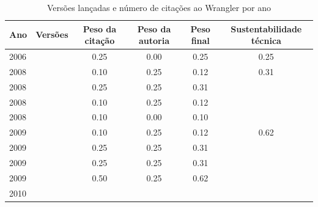 \begin{table}[H]
\caption{Versões lançadas e número de citações ao Wrangler por ano}
\centering
\begin{tabular}{| l | c | c | c | c | c |}
  \hline
  Ano & Versões & Peso da citação & Peso da autoria & Peso final & Sustentabilidade técnica \\
  \hline
            2006
          &
          
          &
          0.25
          &
          0.00
          &
          0.25
          &
            {\color{red} 0.25}
          \\
\hline
            2008
          &
          
          &
          0.10
          &
          0.25
          &
          0.12
          &
            {\color{red} 0.31}
          \\
            2008
          &
          
          &
          0.25
          &
          0.25
          &
          0.31
          &
          \\
            2008
          &
          
          &
          0.10
          &
          0.25
          &
          0.12
          &
          \\
            2008
          &
          
          &
          0.10
          &
          0.00
          &
          0.10
          &
          \\
\hline
            2009
          &
          
          &
          0.10
          &
          0.25
          &
          0.12
          &
            {\color{blue} 0.62}
          \\
            2009
          &
          
          &
          0.25
          &
          0.25
          &
          0.31
          &
          \\
            2009
          &
          
          &
          0.25
          &
          0.25
          &
          0.31
          &
          \\
            2009
          &
          
          &
          0.50
          &
          0.25
          &
          0.62
          &
          \\
\hline
            2010
          &
          

\end{tabular}
\end{table}
